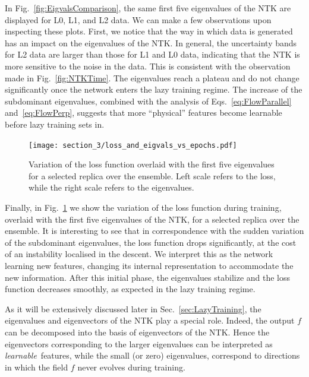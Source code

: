 In Fig.~\ref{fig:EigvalsComparison}, the same first five eigenvalues of the NTK
are displayed for L0, L1, and L2 data. We can make a few observations upon
inspecting these plots. First, we notice that the way in which data is generated
has an impact on the eigenvalues of the NTK. In general, the uncertainty bands
for L2 data are larger than those for L1 and L0 data, indicating that the NTK is
more sensitive to the noise in the data. This is consistent with the observation
made in Fig.~\ref{fig:NTKTime}. The eigenvalues reach a plateau and do not
change significantly once the network enters the lazy training regime. The
increase of the subdominant eigenvalues, combined with the analysis of
Eqs.~\eqref{eq:FlowParallel} and~\eqref{eq:FlowPerp}, suggests that more
``physical'' features become learnable before lazy training sets in.

\begin{figure}[t]
  \centering
  \texttt{[image: section\_3/loss\_and\_eigvals\_vs\_epochs.pdf]}  
  \caption{Variation of the loss function overlaid with the first five
  eigenvalues for a selected replica over the ensemble. Left scale refers to the
  loss, while the right scale refers to the eigenvalues.}
  \label{fig:Loss}
\end{figure}

Finally, in Fig.~\ref{fig:Loss} we show the variation of the loss function
during training, overlaid with the first five eigenvalues of the NTK, for a
selected replica over the ensemble. It is interesting to see that in
correspondence with the sudden variation of the subdominant eigenvalues, the
loss function drops significantly, at the cost of an instability localised in
the descent. We interpret this as the network learning new features, changing
its internal representation to accommodate the new information. After this
initial phase, the eigenvalues stabilize and the loss function decreases
smoothly, as expected in the lazy training regime.

As it will be extensively discussed later in Sec.~\ref{sec:LazyTraining}, the
eigenvalues and eigenvectors of the NTK play a special role. Indeed, the output
$f$ can be decomposed into the basis of eigenvectors of the NTK. Hence the
eigenvectors corresponding to the larger eigenvalues can be interpreted as {\em
learnable}\ features, while the small (or zero) eigenvalues, correspond to
directions in which the field $f$ never evolves during training.

